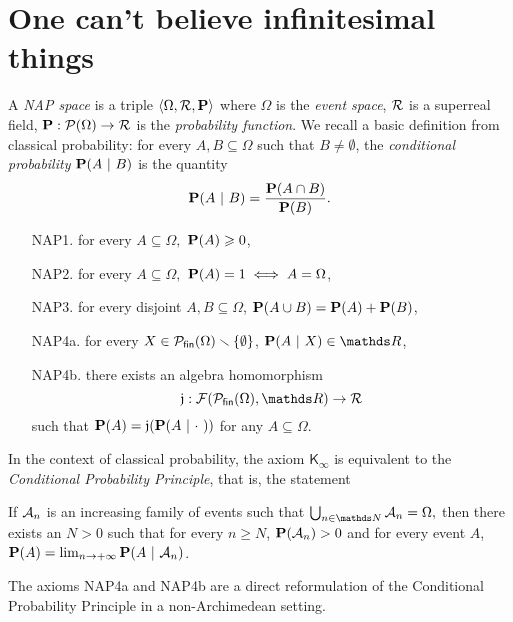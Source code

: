 \documentclass[draft.tex]{subfiles}
\begin{document}
	\section{One can’t believe infinitesimal things}
	A \emph{NAP space} is a triple $\langle \Omega, \mathcal{R}, \textbf{P}\rangle$ where $\Omega$ is the \emph{event space}, $\mathcal{R}$ is a superreal field, $\textbf{P}: \mathcal{P}(\Omega) \to \mathcal{R}$ is the \emph{probability function}. We recall a basic definition from classical probability: for every $A, B \subseteq \Omega$ such that $B \neq \emptyset$, the \emph{conditional probability} $\textbf{P}(A \ \vert \  B)$ is the quantity
	\begin{equation*}
	    \textbf{P}(A \ \vert \ B) = \frac{\textbf{P}(A \cap  B)}{\textbf{P}(B)}.
	\end{equation*}
	\begin{itemize}
	    \item[\textsf{NAP1}.] for every $A \subseteq \Omega,$ $\textbf{P}(A) \geqslant 0$,
	    \item[\textsf{NAP2}.] for every $A \subseteq \Omega,$ $\textbf{P}(A) = 1 \iff A = \Omega$,
	    \item[\textsf{NAP3}.] for every disjoint $A, B \subseteq \Omega$, $\textbf{P}(A \cup B) = \textbf{P}(A) + \textbf{P}(B)$,
	    \item[\textsf{NAP4a}.] for every $X \in \mathcal{P}_{\mathsf{fin}}(\Omega) \smallsetminus \{\emptyset\}$, $\prob(A \ \vert \ X) \in \RR$,
	    \item[\textsf{NAP4b}.] there exists an algebra homomorphism
	    \begin{equation*}
	        \mathfrak{j}: \cl{F}(\finset{\Omega}, \RR) \to \cl{R}
	    \end{equation*}
	    such that $\prob(A) = \mathfrak{j}(\prob(A \ \vert \ \cdot \ ))$ for any $A \subseteq \Omega$.
	\end{itemize}
    In the context of classical probability, the axiom $\mathsf{K_{\infty}}$ is equivalent to the \emph{Conditional Probability Principle}, that is, the statement 
    \begin{cpp}
    If $\mathcal{A}_n$ is an increasing family of events such that $\bigcup_{n \in \NN} \cl{A}_n = \Omega,$ then there exists an $N > 0$ such that for every $n \geq N$, $\textbf{P}(\mathcal{A}_n) > 0$ and for every event $A$, $\prob(A) = \lim_{n \to +\infty} \prob(A \ \vert \ \cl{A}_n)$.
    \end{cpp}
    The axioms \textsf{NAP4a} and \textsf{NAP4b} are a direct reformulation of the Conditional Probability Principle in a non-Archimedean setting.
\end{document}

